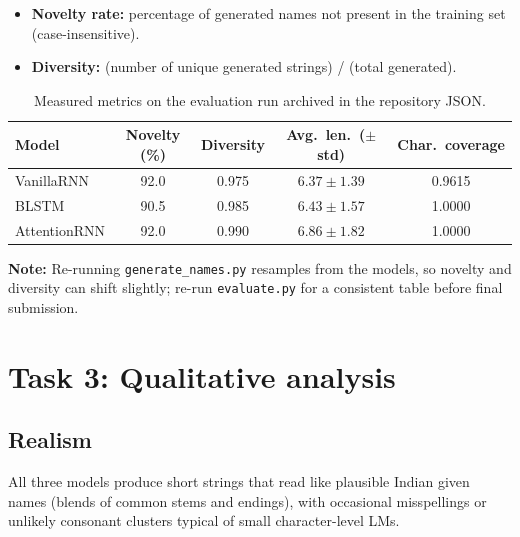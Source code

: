 \documentclass[11pt,a4paper]{article}
\begin{document}
\begin{itemize}[nosep]
  \item \textbf{Novelty rate:} percentage of generated names not present in the training set (case-insensitive).
  \item \textbf{Diversity:} (number of unique generated strings) / (total generated).
\end{itemize}

\begin{table}[h]
  \centering
  \caption{Measured metrics on the evaluation run archived in the repository JSON.}
  \label{tab:metrics}
  \begin{tabular}{lcccc}
    \toprule
    Model & Novelty (\%) & Diversity & Avg.\ len.\ ($\pm$ std) & Char.\ coverage \\
    \midrule
    VanillaRNN   & 92.0 & 0.975 & $6.37 \pm 1.39$ & 0.9615 \\
    BLSTM        & 90.5 & 0.985 & $6.43 \pm 1.57$ & 1.0000 \\
    AttentionRNN & 92.0 & 0.990 & $6.86 \pm 1.82$ & 1.0000 \\
    \bottomrule
  \end{tabular}
\end{table}

\noindent
\textbf{Note:} Re-running \texttt{generate\_names.py} resamples from the models, so
novelty and diversity can shift slightly; re-run \texttt{evaluate.py} for a consistent
table before final submission.


\section{Task 3: Qualitative analysis}
\subsection{Realism}
All three models produce short strings that read like plausible Indian given names
(blends of common stems and endings), with occasional misspellings or unlikely
consonant clusters typical of small character-level LMs.
\end{document}
